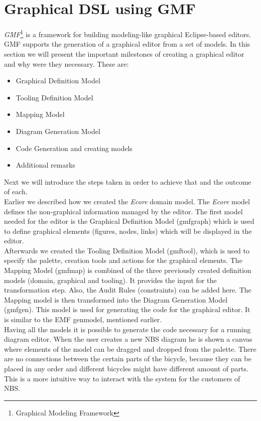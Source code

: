 \section{Graphical DSL using GMF}
\label{sec.gmf}

\noindent \emph{GMF}\footnote{Graphical Modeling Framework} is a framework for
building modeling-like graphical Eclipse-based editors.
\cite{Article_Introducing_GMF} GMF supports the generation of a graphical editor
from a set of models. In this section we will present the important
milestones of creating a graphical editor and why were they necessary. These
are:

\begin{itemize}
  \item Graphical Definition Model
  \item Tooling Definition Model
  \item Mapping Model
  \item Diagram Generation Model
  \item Code Generation and creating models
  \item Additional remarks
\end{itemize}
Next we will introduce the steps taken in order to achieve
that and the outcome of each.\\

\noindent Earlier we described how we created the \emph{Ecore} domain model. The
\emph{Ecore} model defines the non-graphical information managed by the editor. The first
model needed for the editor is the Graphical Definition Model (gmfgraph) which
is used to define graphical elements (figures, nodes, links)
which will be displayed in the editor. \\

\noindent Afterwards we created the Tooling Definition Model (gmftool),
which is used to specify the palette, creation tools and actions for the
graphical elements. The Mapping Model (gmfmap) is combined of the three
previously created definition models (domain, graphical and tooling).
It provides the input for the transformation step. Also, the Audit Rules
(constraints) can be added here. The Mapping model is then transformed into the Diagram
Generation Model (gmfgen). This model is used for generating the code for the graphical
editor. It is similar to the EMF genmodel, mentioned earlier.
\cite{GMF_Tutorial}\\

\noindent Having all the models it is possible to generate the code necessary
for a running diagram editor. When the user creates a new NBS diagram he is
shown a canvas where elements of the model can be dragged and dropped from the
palette. There are no connections between the certain parts
of the bicycle, because they can be placed in any order and different bicycles
might have different amount of parts. This is a more intuitive way to interact
with the system for the customers of NBS.\\


